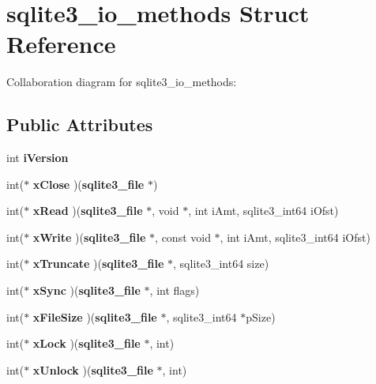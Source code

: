 \section{sqlite3\_\-io\_\-methods Struct Reference}
\label{structsqlite3__io__methods}
Collaboration diagram for sqlite3\_\-io\_\-methods:\subsection*{Public Attributes}
\begin{CompactItemize}
\item 
int {\bf iVersion}\label{structsqlite3__io__methods_1138620d71393e6105389670719d9685}

\item 
int($\ast$ \textbf{xClose} )({\bf sqlite3\_\-file} $\ast$)\label{structsqlite3__io__methods_38f9e3ecb6bc5ed12f45fca5d85344c8}

\item 
int($\ast$ \textbf{xRead} )({\bf sqlite3\_\-file} $\ast$, void $\ast$, int iAmt, sqlite3\_\-int64 iOfst)\label{structsqlite3__io__methods_fd9c9bd674df251d9fc83fe3c9264e49}

\item 
int($\ast$ \textbf{xWrite} )({\bf sqlite3\_\-file} $\ast$, const void $\ast$, int iAmt, sqlite3\_\-int64 iOfst)\label{structsqlite3__io__methods_da19091e7f4ffc5accb40e38d001a801}

\item 
int($\ast$ \textbf{xTruncate} )({\bf sqlite3\_\-file} $\ast$, sqlite3\_\-int64 size)\label{structsqlite3__io__methods_206ff66f685638f41a052036912f3303}

\item 
int($\ast$ \textbf{xSync} )({\bf sqlite3\_\-file} $\ast$, int flags)\label{structsqlite3__io__methods_66cbb6be226b7c7a09d2f3c43a9f95b5}

\item 
int($\ast$ \textbf{xFileSize} )({\bf sqlite3\_\-file} $\ast$, sqlite3\_\-int64 $\ast$pSize)\label{structsqlite3__io__methods_b64f72852b709be630716b073ee18d81}

\item 
int($\ast$ \textbf{xLock} )({\bf sqlite3\_\-file} $\ast$, int)\label{structsqlite3__io__methods_a2fca6e81fd5d6a66a0d301014634e8c}

\item 
int($\ast$ \textbf{xUnlock} )({\bf sqlite3\_\-file} $\ast$, int)\label{structsqlite3__io__methods_8029cb982202ac5d08f5a556f3b3d49b}


\end{CompactItemize}
